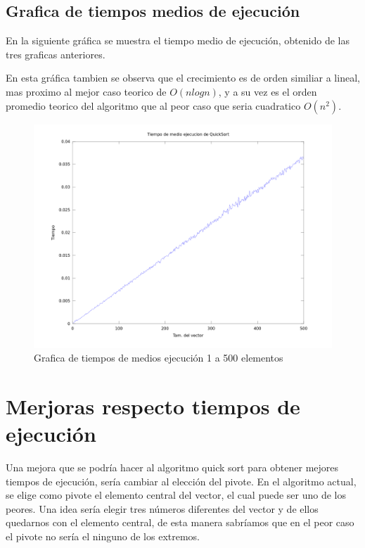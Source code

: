 \documentclass[a4,12pt]{article}
\begin{document}
\subsection{Grafica de tiempos medios de ejecución}
En la siguiente gráfica se muestra el tiempo medio de ejecución, obtenido de las tres graficas anteriores.

En esta gráfica tambien se observa que el crecimiento es de orden similiar a lineal, mas proximo al mejor caso teorico de $O(nlogn)$, y a su vez es el orden promedio teorico del algoritmo que al peor caso que seria cuadratico $O(n^2)$.
\begin{figure}[h]
\includegraphics[width=1\textwidth]{Graficos/tiemposMedios}
\caption{Grafica de tiempos de medios ejecución 1 a 500 elementos}
\label{fig:tiemposMedios}
\end{figure}

\section{Merjoras respecto tiempos de ejecución}
Una mejora que se podría hacer al algoritmo quick sort para obtener mejores tiempos de ejecución, sería cambiar al elección del pivote. 
En el algoritmo actual, se elige como pivote el elemento central del vector, el cual puede ser uno de los peores. Una idea sería elegir tres números diferentes del vector y de ellos quedarnos con el elemento central, de esta manera sabríamos que en el peor caso el pivote no sería el ninguno de los extremos.
\end{document}
